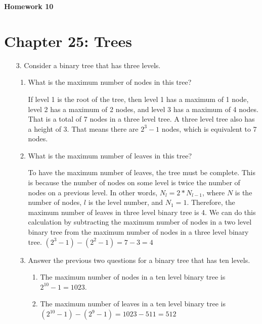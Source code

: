 \documentclass[10pt]{article}
\begin{document}
\begin{center}
	\Large{\textbf{Homework 10}}
\end{center}

\section{Chapter 25: Trees}

\begin{enumerate}
	\item[3.] Consider a binary tree that has three levels.
		\begin{enumerate}
			\item What is the maximum number of nodes in this tree?
				
				\vspace{0.5cm}
				If level 1 is the root of the tree, then level 1 has a maximum of 1 node, level 2 has a maximum of 2 nodes, and level 3 has a maximum of 4 nodes. That is a total of 7 nodes in a three level tree. A three level tree also has a height of 3. That means there are $2^3 - 1$ nodes, which is equivalent to 7 nodes.
				\vspace{0.5cm}
			
			\item What is the maximum number of leaves in this tree?
				
				\vspace{0.5cm}
				To have the maximum number of leaves, the tree must be complete. This is because the number of nodes on some level is twice the number of nodes on a previous level. In other words, $N_l = 2 * N_{l - 1}$, where $N$ is the number of nodes, $l$ is the level number, and $N_1 = 1$. Therefore, the maximum number of leaves in three level binary tree is 4. We can do this calculation by subtracting the maximum number of nodes in a two level binary tree from the maximum number of nodes in a three level binary tree. $(2^3 - 1) - (2^2 - 1) = 7 - 3 = 4$
				\vspace{0.5cm}
			
			\item Answer the previous two questions for a binary tree that has ten levels.
				\begin{enumerate}
					\item The maximum number of nodes in a ten level binary tree is $2^{10} - 1 = 1023$.
					
					\item The maximum number of leaves in a ten level binary tree is $(2^{10} - 1) - (2^{9} - 1) = 1023 - 511 = 512$
				\end{enumerate}
		\end{enumerate}
	

\end{enumerate}
\end{document}

